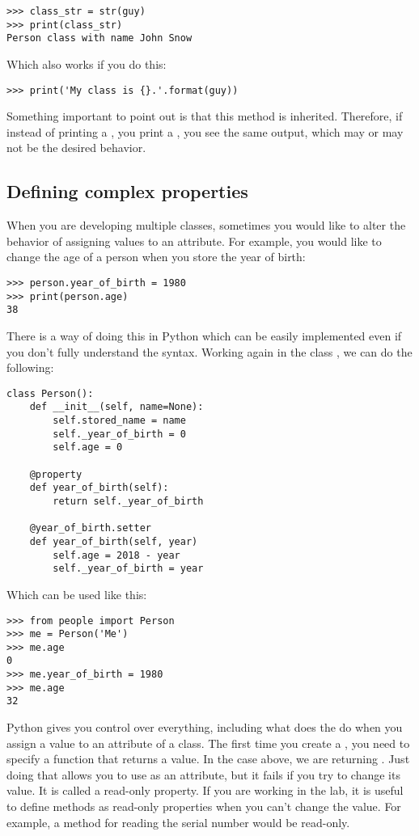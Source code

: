 \begin{verbatim}
>>> class_str = str(guy)
>>> print(class_str)
Person class with name John Snow
\end{verbatim}

Which also works if you do this:

\begin{verbatim}
>>> print('My class is {}.'.format(guy))
\end{verbatim}

Something important to point out is that this method is inherited. Therefore, if instead of printing a , you print a , you see the same output, which may or may not be the desired behavior.

\subsection{Defining complex properties}
When you are developing multiple classes, sometimes you would like to alter the behavior of assigning values to an attribute. For example, you would like to change the age of a person when you store the year of birth:
\begin{verbatim}
>>> person.year_of_birth = 1980
>>> print(person.age)
38
\end{verbatim}

There is a way of doing this in Python which can be easily implemented even if you don't fully understand the syntax. Working again in the class , we can do the following:
\begin{verbatim}
class Person():
    def __init__(self, name=None):
        self.stored_name = name
        self._year_of_birth = 0
        self.age = 0

    @property
    def year_of_birth(self):
        return self._year_of_birth

    @year_of_birth.setter
    def year_of_birth(self, year)
        self.age = 2018 - year
        self._year_of_birth = year
\end{verbatim}
Which can be used like this:
\begin{verbatim}
>>> from people import Person
>>> me = Person('Me')
>>> me.age
0
>>> me.year_of_birth = 1980
>>> me.age
32
\end{verbatim}

Python gives you control over everything, including what does the \py{=} do when you assign a value to an attribute of a class. The first time you create a , you need to specify a function that returns a value. In the case above, we are returning . Just doing that allows you to use  as an attribute, but it fails if you try to change its value. It is called a read-only property. If you are working in the lab, it is useful to define methods as read-only properties when you can't change the value. For example, a method for reading the serial number would be read-only.

